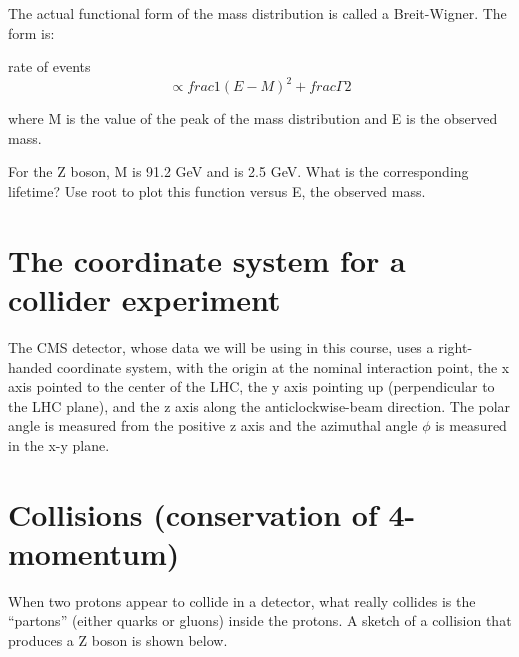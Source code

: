 The actual functional form of the mass distribution is called a Breit-Wigner.  The form is:

	 rate of events \begin{equation} \propto frac{1}{(E-M)^2 + frac{\Gamma}{2}} \end{equation} 

where M is the value of the peak of the mass distribution and E is the observed mass.

\vspace{.2cm} 
\begin{minipage}{0.7\textwidth} 
\begin{framed}
\begin{exercise}
{For the Z boson, M is 91.2 GeV and   is 2.5 GeV.  What is the corresponding lifetime?  Use root to plot this function versus E, the observed mass.}
\end{exercise}
\end{framed} 
\end{minipage}
\vspace{.2cm}




\section{The coordinate system for a collider experiment}

The CMS detector, whose data we will be using in this course, uses a right-handed coordinate system, with the origin at the nominal interaction point, the x axis pointed to the center of the LHC, the y axis pointing up (perpendicular to the LHC plane), and the z axis along the anticlockwise-beam direction.  The polar angle   is measured from the positive z axis and the azimuthal angle  $\phi$  is measured in the x-y plane.

\section{Collisions (conservation of 4-momentum)}

When two protons appear to collide in a detector, what really collides is the “partons” (either quarks or gluons) inside the protons.  A sketch of a collision that produces a Z boson is shown below.
 


